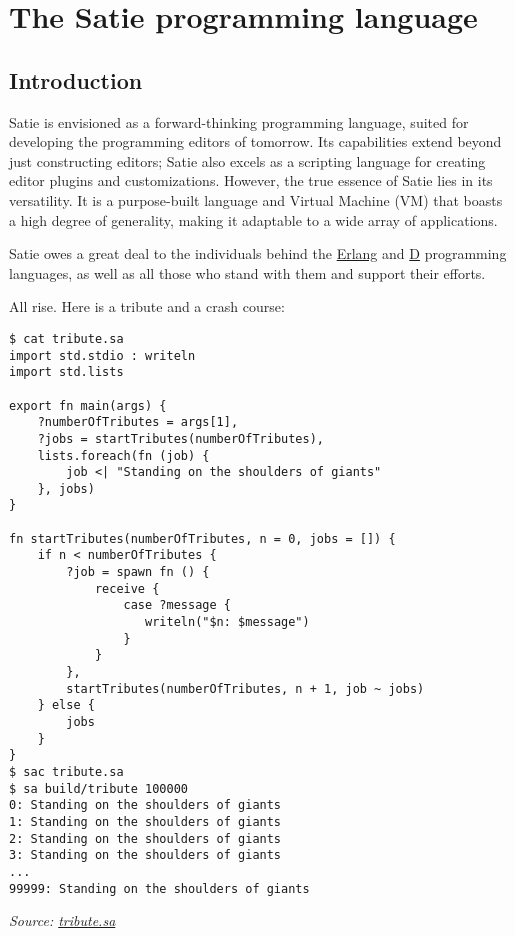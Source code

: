 \hypertarget{the-satie-programming-language}{%
\section{The Satie programming
language}\label{the-satie-programming-language}}

\hypertarget{introduction}{%
\subsection{Introduction}\label{introduction}}

Satie is envisioned as a forward-thinking programming language, suited
for developing the programming editors of tomorrow. Its capabilities
extend beyond just constructing editors; Satie also excels as a
scripting language for creating editor plugins and customizations.
However, the true essence of Satie lies in its versatility. It is a
purpose-built language and Virtual Machine (VM) that boasts a high
degree of generality, making it adaptable to a wide array of
applications.

Satie owes a great deal to the individuals behind the
\href{https://www.erlang.org/}{Erlang} and \href{https://dlang.org/}{D}
programming languages, as well as all those who stand with them and
support their efforts.

All rise. Here is a tribute and a crash course:

\begin{verbatim}
$ cat tribute.sa
import std.stdio : writeln
import std.lists

export fn main(args) {
    ?numberOfTributes = args[1],
    ?jobs = startTributes(numberOfTributes),
    lists.foreach(fn (job) {
        job <| "Standing on the shoulders of giants"
    }, jobs)
}

fn startTributes(numberOfTributes, n = 0, jobs = []) {
    if n < numberOfTributes {
        ?job = spawn fn () {
            receive {
                case ?message {
                   writeln("$n: $message")
                }
            }
        },
        startTributes(numberOfTributes, n + 1, job ~ jobs)
    } else {
        jobs
    }
}
$ sac tribute.sa
$ sa build/tribute 100000
0: Standing on the shoulders of giants
1: Standing on the shoulders of giants
2: Standing on the shoulders of giants
3: Standing on the shoulders of giants
...
99999: Standing on the shoulders of giants
\end{verbatim}

\emph{Source: \href{../grammar/tribute.sa}{tribute.sa}}

